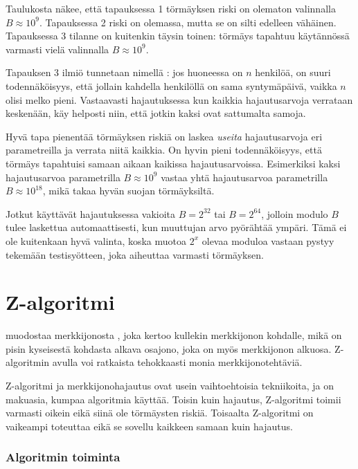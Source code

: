 Taulukosta näkee, että tapauksessa 1
törmäyksen riski on olematon
valinnalla $B \approx 10^9$.
Tapauksessa 2 riski on olemassa, mutta se on silti edelleen vähäinen.
Tapauksessa 3 tilanne on kuitenkin täysin toinen:
törmäys tapahtuu käytännössä varmasti
vielä valinnalla $B \approx 10^9$.


Tapauksen 3 ilmiö tunnetaan nimellä
:
jos huoneessa on $n$ henkilöä, on suuri
todennäköisyys, että jollain kahdella
henkilöllä on sama syntymäpäivä, vaikka
$n$ olisi melko pieni.
Vastaavasti hajautuksessa kun kaikkia
hajautusarvoja verrataan keskenään,
käy helposti niin, että jotkin
kaksi ovat sattumalta samoja.

Hyvä tapa pienentää törmäyksen riskiä on laskea
\emph{useita} hajautusarvoja eri parametreilla
ja verrata niitä kaikkia.
On hyvin pieni todennäköisyys,
että törmäys tapahtuisi samaan aikaan
kaikissa hajautusarvoissa.
Esimerkiksi kaksi hajautusarvoa parametrilla
$B \approx 10^9$ vastaa yhtä hajautusarvoa
parametrilla $B \approx 10^{18}$,
mikä takaa hyvän suojan törmäyksiltä.

Jotkut käyttävät hajautuksessa vakioita $B=2^{32}$ tai $B=2^{64}$,
jolloin modulo $B$ tulee laskettua
automaattisesti, kun muuttujan arvo pyörähtää ympäri.
Tämä ei ole kuitenkaan hyvä valinta,
koska muotoa $2^x$ olevaa moduloa vastaan
pystyy tekemään testisyötteen, joka aiheuttaa varmasti törmäyksen.

\section{Z-algoritmi}


 muodostaa merkkijonosta ,
joka kertoo kullekin merkkijonon kohdalle,
mikä on pisin kyseisestä kohdasta alkava osajono,
joka on myös merkkijonon alkuosa.
Z-algoritmin avulla voi ratkaista tehokkaasti
monia merkkijonotehtäviä.

Z-algoritmi ja merkkijonohajautus ovat usein
vaihtoehtoisia tekniikoita, ja on makuasia,
kumpaa algoritmia käyttää.
Toisin kuin hajautus, Z-algoritmi toimii
varmasti oikein eikä siinä ole törmäysten riskiä.
Toisaalta Z-algoritmi on vaikeampi toteuttaa eikä
se sovellu kaikkeen samaan kuin hajautus.

\subsubsection*{Algoritmin toiminta}

